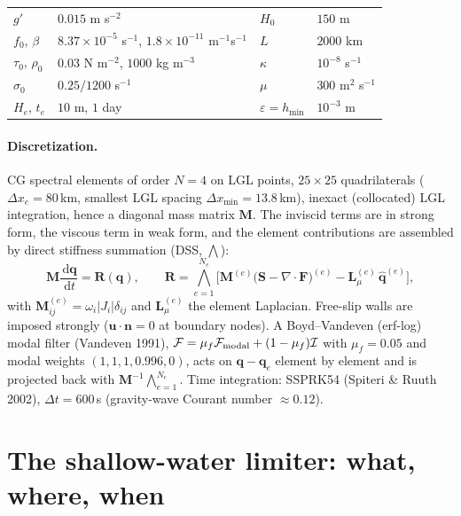 \documentclass[11pt]{article}
\newcommand{\bq}{\mathbf{q}}
\newcommand{\bF}{\mathbf{F}}
\newcommand{\bS}{\mathbf{S}}
\newcommand{\bR}{\mathbf{R}}
\newcommand{\bu}{\mathbf{u}}
\newcommand{\dd}{\,\mathrm{d}}
\newcommand{\DSS}{\bigwedge_{e=1}^{N_e}}
\begin{document}
\begin{center}\small
\begin{tabular}{@{}llll@{}}
\toprule
$g'$ & $0.015$ m s$^{-2}$ & $H_0$ & $150$ m\\
$f_0$, $\beta$ & $8.37\times10^{-5}$ s$^{-1}$, $1.8\times10^{-11}$ m$^{-1}$s$^{-1}$ & $L$ & $2000$ km\\
$\tau_0$, $\rho_0$ & $0.03$ N m$^{-2}$, $1000$ kg m$^{-3}$ & $\kappa$ & $10^{-8}$ s$^{-1}$\\
$\sigma_0$ & $0.25/1200$ s$^{-1}$ & $\mu$ & $300$ m$^2$ s$^{-1}$\\
$H_e$, $t_e$ & $10$ m, $1$ day & $\varepsilon=h_{\min}$ & $10^{-3}$ m\\
\bottomrule
\end{tabular}
\end{center}

\paragraph{Discretization.} CG spectral elements of order $N=4$ on LGL
points, $25\times25$ quadrilaterals ($\Delta x_e=80$\,km, smallest LGL spacing
$\Delta x_{\min}=13.8$\,km), inexact (collocated) LGL integration, hence a
diagonal mass matrix $\mathbf{M}$. The inviscid terms are in strong form, the
viscous term in weak form, and the element contributions are assembled by
direct stiffness summation (DSS, $\bigwedge$):
\begin{equation}
\mathbf{M}\frac{\dd\bq}{\dd t}=\bR(\bq),\qquad
\bR=\DSS\Big[\mathbf{M}^{(e)}\big(\bS-\nabla\cdot\bF\big)^{(e)}
-\mathbf{L}^{(e)}_{\mu}\,\hat{\bq}^{(e)}\Big],
\label{eq:semi}
\end{equation}
with $\mathbf{M}^{(e)}_{ij}=\omega_i|J_i|\delta_{ij}$ and
$\mathbf{L}^{(e)}_\mu$ the element Laplacian. Free-slip walls are imposed
strongly ($\bu\cdot\mathbf{n}=0$ at boundary nodes). A Boyd--Vandeven (erf-log)
modal filter (Vandeven 1991), $\mathcal{F}=\mu_f\mathcal{F}_{\rm modal}+(1-\mu_f)\mathcal{I}$
with $\mu_f=0.05$ and modal weights $(1,1,1,0.996,0)$, acts on $\bq-\bq_e$
element by element and is projected back with $\mathbf{M}^{-1}\DSS$.
Time integration: SSPRK54 (Spiteri \& Ruuth 2002), $\Delta t=600$\,s
(gravity-wave Courant number $\approx0.12$).

\section{The shallow-water limiter: what, where, when}
\label{sec:limiter}
\end{document}
